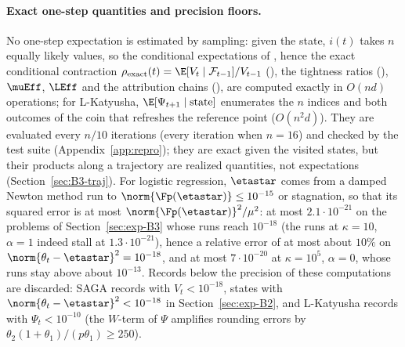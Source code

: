 \paragraph{Exact one-step quantities and precision floors.}
No one-step expectation is estimated by sampling: given the state, $i(t)$ takes $n$ equally likely values, so the
conditional expectations of , hence the exact conditional contraction
$\rho_{\rm exact}(t)=\E[V_t\mid\mathcal F_{t-1}]/V_{t-1}$ (), the tightness ratios
(), $\muEff$, $\LEff$ and the
attribution chains (), are computed exactly in $O(nd)$ operations; for L-Katyusha,
$\E[\Psi_{t+1}\mid\text{state}]$ enumerates the $n$ indices and both outcomes of the coin that refreshes the reference
point ($O(n^2d)$). They are evaluated every $n/10$ iterations (every iteration when $n=16$) and checked by the test
suite (Appendix~\ref{app:repro}); they are exact given the visited states, but their products along a trajectory are
realized quantities, not expectations (Section~\ref{sec:B3-traj}). For logistic regression, $\etastar$ comes from a
damped Newton method run to $\norm{\Fp(\etastar)}\le10^{-15}$ or stagnation, so that its squared error is at most
$\norm{\Fp(\etastar)}^2/\mu^2$: at most $2.1\cdot10^{-21}$ on the problems of Section~\ref{sec:exp-B3} whose runs reach
$10^{-18}$ (the runs at $\kappa=10$, $\alpha=1$ indeed stall at $1.3\cdot10^{-21}$), hence a relative error of at most about
$10\%$ on $\norm{\theta_t-\etastar}^2=10^{-18}$, and at most $7\cdot10^{-20}$ at $\kappa=10^5$, $\alpha=0$, whose runs stay
above about $10^{-13}$. Records below the precision of these computations are discarded: SAGA records with
$V_t<10^{-18}$, states with $\norm{\theta_t-\etastar}^2<10^{-18}$ in
Section~\ref{sec:exp-B2}, and L-Katyusha records with $\Psi_t<10^{-10}$ (the $W$-term of $\Psi$ amplifies rounding
errors by $\theta_2(1+\theta_1)/(p\theta_1)\ge250$).

